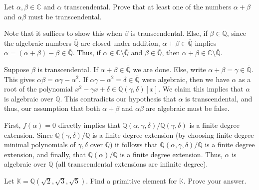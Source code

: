 \documentclass[12 pt, letterpaper]{hmcpset}
\begin{document}
\begin{problem}[Problem 1.]
	Let $\alpha, \beta \in \mathbb{C}$ and $\alpha$ transcendental. Prove that at least one of the numbers $\alpha + \beta$ and $\alpha \beta$ must be transcendental.
\end{problem}

\begin{solution}
	Note that it suffices to show this when $\beta$ is transcendental. Else, if $\beta \in \overline{\mathbb{Q}}$, since the algebraic numbers $\overline{\mathbb{Q}}$ are closed under addition, $\alpha + \beta \in \overline{\mathbb{Q}}$ implies $\alpha = (\alpha + \beta) - \beta \in \overline{\mathbb{Q}}$. Thus, if $\alpha \in \mathbb{C} \setminus \overline{\mathbb{Q}}$ and $\beta \in \overline{\mathbb{Q}}$, then $\alpha + \beta \in \mathbb{C} \setminus \overline{\mathbb{Q}}$.

	Suppose $\beta$ is transcendental. If $\alpha + \beta \in \overline{\mathbb{Q}}$ we are done. Else, write $\alpha + \beta = \gamma \in \overline{\mathbb{Q}}$. This gives $\alpha \beta = \alpha \gamma - \alpha^{2}$. If $\alpha \gamma - \alpha^{2} = \delta \in \overline{\mathbb{Q}}$ were algebraic, then we have $\alpha$ as a root of the polynomial $x^{2} - \gamma x + \delta \in \mathbb{Q}(\gamma, \delta)[x]$. We claim this implies that $\alpha$ is algebraic over $\mathbb{Q}$. This contradicts our hypothesis that $\alpha$ is transcendental, and thus, our assumption that both $\alpha + \beta$ and $\alpha \beta$ are algebraic must be false.

	First, $f(\alpha) = 0$ directly implies that $\mathbb{Q}(\alpha, \gamma, \delta) / \mathbb{Q}(\gamma, \delta)$ is a finite degree extension. Since $\mathbb{Q}(\gamma, \delta) / \mathbb{Q}$ is a finite degree extension (by choosing finite degree minimal polynomials of $\gamma, \delta$ over $\mathbb{Q}$) it follows that $\mathbb{Q}(\alpha, \gamma, \delta) / \mathbb{Q}$ is a finite degree extension, and finally, that $\mathbb{Q}(\alpha) / \mathbb{Q}$ is a finite degree extension. Thus, $\alpha$ is algebraic over $\mathbb{Q}$ (all transcendental extensions are infinite degree).
\end{solution}

\pagebreak

\begin{problem}[Problem 2.]
	Let $\mathbb{K} = \mathbb{Q}(\sqrt{2}, \sqrt{3}, \sqrt{5})$. Find a primitive element for $\mathbb{K}$. Prove your answer.
\end{problem}
\end{document}
